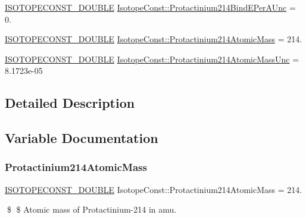 \begin{DoxyCompactItemize}
\item 
\mbox{\hyperlink{group___isotope_const-_macros_ga8f45a7272ce02c0b4c65c44636ed719a}{I\+S\+O\+T\+O\+P\+E\+C\+O\+N\+S\+T\+\_\+\+D\+O\+U\+B\+LE}} \mbox{\hyperlink{group___isotope_const-_protactinium-_pa214_gaa502312147f46dc1af28c83fc759bbc1}{Isotope\+Const\+::\+Protactinium214\+Bind\+E\+Per\+A\+Unc}} = 0.
\item 
\mbox{\hyperlink{group___isotope_const-_macros_ga8f45a7272ce02c0b4c65c44636ed719a}{I\+S\+O\+T\+O\+P\+E\+C\+O\+N\+S\+T\+\_\+\+D\+O\+U\+B\+LE}} \mbox{\hyperlink{group___isotope_const-_protactinium-_pa214_ga341717f9b9324fa4192bc0b982d3e141}{Isotope\+Const\+::\+Protactinium214\+Atomic\+Mass}} = 214.
\item 
\mbox{\hyperlink{group___isotope_const-_macros_ga8f45a7272ce02c0b4c65c44636ed719a}{I\+S\+O\+T\+O\+P\+E\+C\+O\+N\+S\+T\+\_\+\+D\+O\+U\+B\+LE}} \mbox{\hyperlink{group___isotope_const-_protactinium-_pa214_ga0cdecc8aa3ec8439c11d756c2fd37202}{Isotope\+Const\+::\+Protactinium214\+Atomic\+Mass\+Unc}} = 8.\+1723e-\/05
\end{DoxyCompactItemize}


\subsection{Detailed Description}


\subsection{Variable Documentation}
\mbox{\label{group___isotope_const-_protactinium-_pa214_ga341717f9b9324fa4192bc0b982d3e141}} 
\subsubsection{\texorpdfstring{Protactinium214\+Atomic\+Mass}{Protactinium214AtomicMass}}
{\footnotesize\ttfamily \mbox{\hyperlink{group___isotope_const-_macros_ga8f45a7272ce02c0b4c65c44636ed719a}{I\+S\+O\+T\+O\+P\+E\+C\+O\+N\+S\+T\+\_\+\+D\+O\+U\+B\+LE}} Isotope\+Const\+::\+Protactinium214\+Atomic\+Mass = 214.}

\$ \$ Atomic mass of Protactinium-\/214 in amu. \mbox{\label{group___isotope_const-_protactinium-_pa214_ga0cdecc8aa3ec8439c11d756c2fd37202}} 
